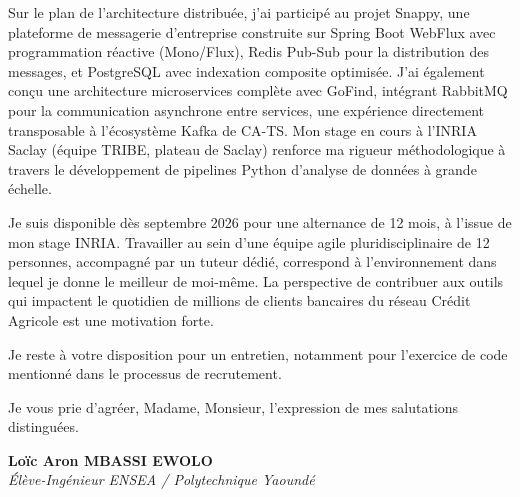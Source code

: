\documentclass[a4paper,11pt]{article}
\begin{document}
Sur le plan de l'architecture distribuée, j'ai participé au projet Snappy, une plateforme de messagerie d'entreprise construite sur Spring Boot WebFlux avec programmation réactive (Mono/Flux), Redis Pub-Sub pour la distribution des messages, et PostgreSQL avec indexation composite optimisée. J'ai également conçu une architecture microservices complète avec GoFind, intégrant RabbitMQ pour la communication asynchrone entre services, une expérience directement transposable à l'écosystème Kafka de CA-TS. Mon stage en cours à l'INRIA Saclay (équipe TRIBE, plateau de Saclay) renforce ma rigueur méthodologique à travers le développement de pipelines Python d'analyse de données à grande échelle.

Je suis disponible dès septembre 2026 pour une alternance de 12 mois, à l'issue de mon stage INRIA. Travailler au sein d'une équipe agile pluridisciplinaire de 12 personnes, accompagné par un tuteur dédié, correspond à l'environnement dans lequel je donne le meilleur de moi-même. La perspective de contribuer aux outils qui impactent le quotidien de millions de clients bancaires du réseau Crédit Agricole est une motivation forte.

Je reste à votre disposition pour un entretien, notamment pour l'exercice de code mentionné dans le processus de recrutement.

Je vous prie d'agréer, Madame, Monsieur, l'expression de mes salutations distinguées.

\vspace{0.8cm}

\textbf{Loïc Aron MBASSI EWOLO}\\
\textit{Élève-Ingénieur ENSEA / Polytechnique Yaoundé}
\end{document}
